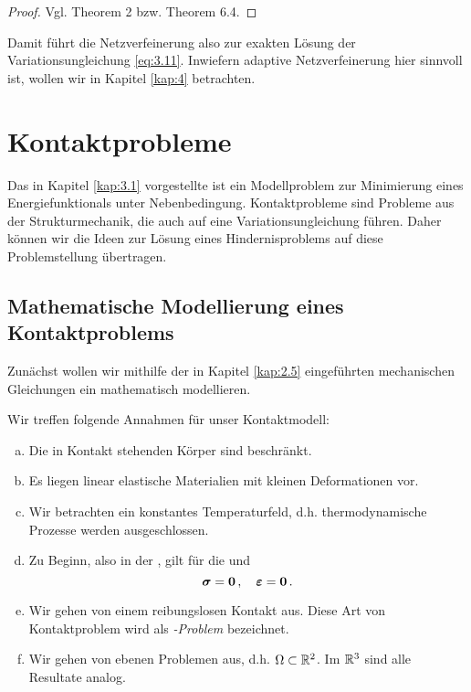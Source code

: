 \begin{proof}
Vgl. \cite{Falk} Theorem 2 bzw. \cite{EPS} Theorem 6.4.
\end{proof}


Damit führt die Netzverfeinerung also zur exakten Lösung der Variationsungleichung \eqref{eq:3.11}. Inwiefern adaptive Netzverfeinerung hier sinnvoll ist, wollen wir in Kapitel \ref{kap:4} betrachten.








\section{Kontaktprobleme}
\label{kap:3.2}


Das in Kapitel \ref{kap:3.1} vorgestellte  ist ein Modellproblem zur Minimierung eines Energiefunktionals unter Nebenbedingung. Kontaktprobleme sind Probleme aus der Strukturmechanik, die auch auf eine Variationsungleichung führen. Daher können wir die Ideen zur Lösung eines Hindernisproblems auf diese Problemstellung übertragen.


\subsection{Mathematische Modellierung eines Kontaktproblems}
\label{kap:3.2.1}

Zunächst wollen wir mithilfe der in Kapitel \ref{kap:2.5} eingeführten mechanischen Gleichungen ein  mathematisch modellieren.

\begin{vor}\label{vor:3.18}
Wir treffen folgende Annahmen für unser Kontaktmodell:
\begin{enumerate}[(a)]
\item Die in Kontakt stehenden Körper sind beschränkt.
\item Es liegen linear elastische Materialien mit kleinen Deformationen  vor.
\item Wir betrachten ein konstantes Temperaturfeld, d.h. thermodynamische Prozesse werden ausgeschlossen.
\item Zu Beginn, also in der , gilt für die  und 
\[
	\boldsymbol \sigma = \boldsymbol 0\, , \quad \boldsymbol {\varepsilon} =\boldsymbol 0 \, .
\]
\item Wir gehen von einem reibungslosen Kontakt aus. Diese Art von Kontaktproblem wird als \textit{-Problem} bezeichnet.
\item Wir gehen von ebenen Problemen aus, d.h. $\Omega \subset \mathbb{R}^2$. Im $\mathbb{R}^3$ sind alle Resultate analog.
\end{enumerate}
\end{vor}


